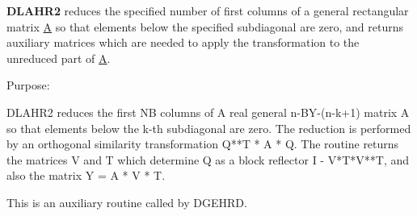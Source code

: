 {\bfseries D\+L\+A\+H\+R2} reduces the specified number of first columns of a general rectangular matrix \hyperlink{classA}{A} so that elements below the specified subdiagonal are zero, and returns auxiliary matrices which are needed to apply the transformation to the unreduced part of \hyperlink{classA}{A}. 

 \begin{DoxyParagraph}{Purpose\+: }
\begin{DoxyVerb} DLAHR2 reduces the first NB columns of A real general n-BY-(n-k+1)
 matrix A so that elements below the k-th subdiagonal are zero. The
 reduction is performed by an orthogonal similarity transformation
 Q**T * A * Q. The routine returns the matrices V and T which determine
 Q as a block reflector I - V*T*V**T, and also the matrix Y = A * V * T.

 This is an auxiliary routine called by DGEHRD.\end{DoxyVerb}
 
\end{DoxyParagraph}

